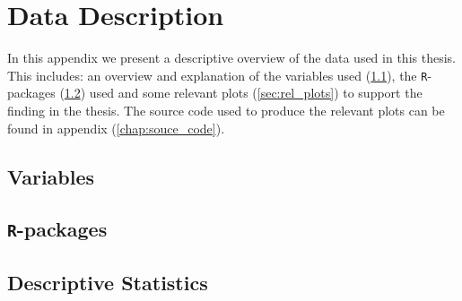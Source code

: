 \documentclass[../thesis.tex]{subfiles}
\begin{document}
\appendix

\chapter{Data Description}
\label{chap:data_desc}

\noindent In this appendix we present a descriptive overview of the data used in this thesis. This includes: an overview and explanation of the variables used (\ref{sec:variables}), the \texttt{R}-packages (\ref{sec:r_pack}) used and some relevant plots (\ref{sec:rel_plots}) to support the finding in the thesis. The source code used to produce the relevant plots can be found in appendix (\ref{chap:souce_code}).  

\section{Variables}
\label{sec:variables}



\section{\texttt{R}-packages}
\label{sec:r_pack}

\section{Descriptive Statistics}
\label{sec:desc_stat}





\newpage



\newpage



\newpage



\newpage



\newpage



\newpage


\end{document}
